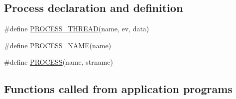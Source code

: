 \subsection*{Process declaration and definition}
\begin{DoxyCompactItemize}
\item 
\#define \hyperlink{group__process_gaa4cff8e4f3abc50c74619a90ae347200}{P\-R\-O\-C\-E\-S\-S\-\_\-\-T\-H\-R\-E\-A\-D}(name, ev, data)
\item 
\#define \hyperlink{group__process_ga96ff784b76d6edef302610d69664025f}{P\-R\-O\-C\-E\-S\-S\-\_\-\-N\-A\-M\-E}(name)
\item 
\#define \hyperlink{group__process_ga27e9b6fc13f0438e37a198f69b38b4cf}{P\-R\-O\-C\-E\-S\-S}(name, strname)
\end{DoxyCompactItemize}
\subsection*{Functions called from application programs}
